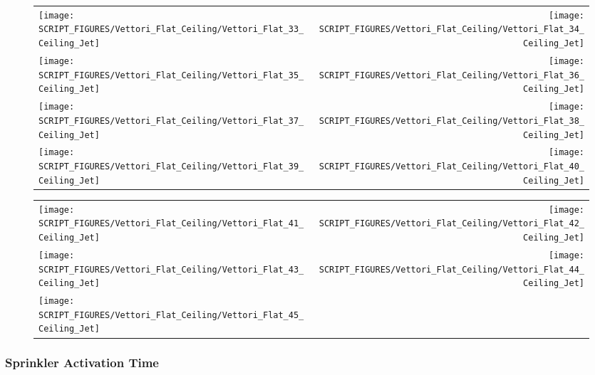 \begin{figure}[p]
\begin{tabular*}{\textwidth}{l@{\extracolsep{\fill}}r}
\texttt{[image: SCRIPT\_FIGURES/Vettori\_Flat\_Ceiling/Vettori\_Flat\_33\_Ceiling\_Jet]} &
\texttt{[image: SCRIPT\_FIGURES/Vettori\_Flat\_Ceiling/Vettori\_Flat\_34\_Ceiling\_Jet]} \\
\texttt{[image: SCRIPT\_FIGURES/Vettori\_Flat\_Ceiling/Vettori\_Flat\_35\_Ceiling\_Jet]} &
\texttt{[image: SCRIPT\_FIGURES/Vettori\_Flat\_Ceiling/Vettori\_Flat\_36\_Ceiling\_Jet]} \\
\texttt{[image: SCRIPT\_FIGURES/Vettori\_Flat\_Ceiling/Vettori\_Flat\_37\_Ceiling\_Jet]} &
\texttt{[image: SCRIPT\_FIGURES/Vettori\_Flat\_Ceiling/Vettori\_Flat\_38\_Ceiling\_Jet]} \\
\texttt{[image: SCRIPT\_FIGURES/Vettori\_Flat\_Ceiling/Vettori\_Flat\_39\_Ceiling\_Jet]} &
\texttt{[image: SCRIPT\_FIGURES/Vettori\_Flat\_Ceiling/Vettori\_Flat\_40\_Ceiling\_Jet]}
\end{tabular*}
\end{figure}

\begin{figure}[p]
\begin{tabular*}{\textwidth}{l@{\extracolsep{\fill}}r}
\texttt{[image: SCRIPT\_FIGURES/Vettori\_Flat\_Ceiling/Vettori\_Flat\_41\_Ceiling\_Jet]} &
\texttt{[image: SCRIPT\_FIGURES/Vettori\_Flat\_Ceiling/Vettori\_Flat\_42\_Ceiling\_Jet]} \\
\texttt{[image: SCRIPT\_FIGURES/Vettori\_Flat\_Ceiling/Vettori\_Flat\_43\_Ceiling\_Jet]} &
\texttt{[image: SCRIPT\_FIGURES/Vettori\_Flat\_Ceiling/Vettori\_Flat\_44\_Ceiling\_Jet]} \\
\texttt{[image: SCRIPT\_FIGURES/Vettori\_Flat\_Ceiling/Vettori\_Flat\_45\_Ceiling\_Jet]}
\end{tabular*}
\end{figure}

\clearpage

\subsubsection{Sprinkler Activation Time}

